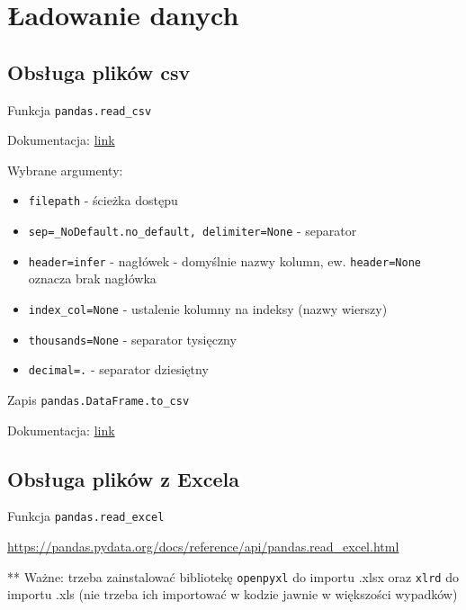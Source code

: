 \documentclass[
  polish,
  letterpaper,
  DIV=11,
  numbers=noendperiod]{scrreprt}
\providecommand{\tightlist}{%
  \setlength{\itemsep}{0pt}\setlength{\parskip}{0pt}}
\begin{document}
\chapter{Ładowanie danych}\label{ux142adowanie-danych}

\section{Obsługa plików csv}\label{obsux142uga-plikuxf3w-csv}

Funkcja \texttt{pandas.read\_csv}

Dokumentacja:
\href{https://pandas.pydata.org/pandas-docs/stable/reference/api/pandas.read_csv.html}{link}

Wybrane argumenty:

\begin{itemize}
\tightlist
\item
  \texttt{filepath} - ścieżka dostępu
\item
  \texttt{sep=\_NoDefault.no\_default,\ delimiter=None} - separator
\item
  \texttt{header=\textquotesingle{}infer\textquotesingle{}} - nagłówek -
  domyślnie nazwy kolumn, ew. \texttt{header=None} oznacza brak nagłówka
\item
  \texttt{index\_col=None} - ustalenie kolumny na indeksy (nazwy
  wierszy)
\item
  \texttt{thousands=None} - separator tysięczny
\item
  \texttt{decimal=\textquotesingle{}.\textquotesingle{}} - separator
  dziesiętny
\end{itemize}

Zapis \texttt{pandas.DataFrame.to\_csv}

Dokumentacja:
\href{https://pandas.pydata.org/pandas-docs/stable/reference/api/pandas.DataFrame.to_csv.html}{link}

\section{Obsługa plików z Excela}\label{obsux142uga-plikuxf3w-z-excela}

Funkcja \texttt{pandas.read\_excel}

\url{https://pandas.pydata.org/docs/reference/api/pandas.read_excel.html}

** Ważne: trzeba zainstalować bibliotekę \texttt{openpyxl} do importu
.xlsx oraz \texttt{xlrd} do importu .xls (nie trzeba ich importować w
kodzie jawnie w większości wypadków)
\end{document}
